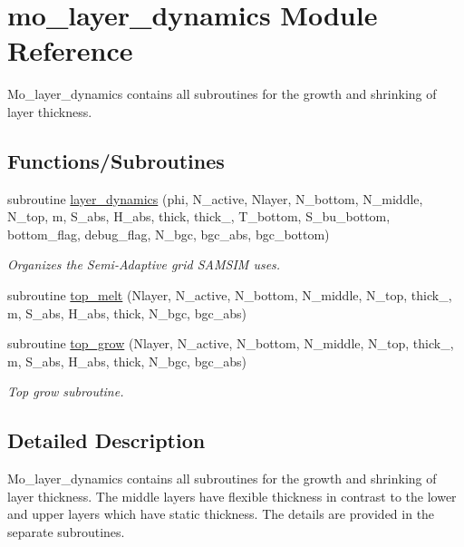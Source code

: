 \hypertarget{namespacemo__layer__dynamics}{
\section{mo\_\-layer\_\-dynamics Module Reference}
\label{namespacemo__layer__dynamics}
}


Mo\_\-layer\_\-dynamics contains all subroutines for the growth and shrinking of layer thickness.  


\subsection*{Functions/Subroutines}
\begin{DoxyCompactItemize}
\item 
subroutine \hyperlink{namespacemo__layer__dynamics_a4b67e1200af1131f76796868c2552a57}{layer\_\-dynamics} (phi, N\_\-active, Nlayer, N\_\-bottom, N\_\-middle, N\_\-top, m, S\_\-abs, H\_\-abs, thick, thick\_, T\_\-bottom, S\_\-bu\_\-bottom, bottom\_\-flag, debug\_\-flag, N\_\-bgc, bgc\_\-abs, bgc\_\-bottom)
\begin{DoxyCompactList}\small\item\em Organizes the Semi-\/Adaptive grid SAMSIM uses. \item\end{DoxyCompactList}\item 
subroutine \hyperlink{namespacemo__layer__dynamics_aadc5de505c96dad5c7fe5bdb233102a6}{top\_\-melt} (Nlayer, N\_\-active, N\_\-bottom, N\_\-middle, N\_\-top, thick\_, m, S\_\-abs, H\_\-abs, thick, N\_\-bgc, bgc\_\-abs)
\item 
subroutine \hyperlink{namespacemo__layer__dynamics_ad2f5a196bac29bfdc04d442b0b722a24}{top\_\-grow} (Nlayer, N\_\-active, N\_\-bottom, N\_\-middle, N\_\-top, thick\_, m, S\_\-abs, H\_\-abs, thick, N\_\-bgc, bgc\_\-abs)
\begin{DoxyCompactList}\small\item\em Top grow subroutine. \item\end{DoxyCompactList}\end{DoxyCompactItemize}


\subsection{Detailed Description}
Mo\_\-layer\_\-dynamics contains all subroutines for the growth and shrinking of layer thickness. The middle layers have flexible thickness in contrast to the lower and upper layers which have static thickness. The details are provided in the separate subroutines.

